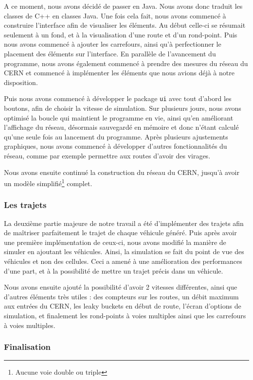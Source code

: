 \documentclass[a4paper,11pt, titlepage]{extarticle}
\begin{document}
A ce moment, nous avons décidé de passer en Java. Nous avons donc traduit les classes de C++ en classes Java. Une fois cela fait, nous avons commencé à construire l'interface afin de visualiser les éléments. Au début celle-ci se résumait seulement à un fond, et à la visualisation d'une route et d'un rond-point. Puis nous avons commencé à ajouter les carrefours, ainsi qu'à perfectionner le placement des éléments sur l'interface. En parallèle de l'avancement du programme, nous avons également commencé à prendre des mesures du réseau du CERN et commencé à implémenter les éléments que nous avions déjà à notre disposition.

Puis nous avons commencé à développer le package \texttt{ui} avec tout d'abord les boutons, afin de choisir la vitesse de simulation. Sur plusieurs jours, nous avons optimisé la boucle qui maintient le programme en vie, ainsi qu'en améliorant l'affichage du réseau, désormais sauvegardé en mémoire et donc n'étant calculé qu'une seule fois au lancement du programme. Après plusieurs ajustements graphiques, nous avons commencé à développer d'autres fonctionnalités du réseau, comme par exemple permettre aux routes d'avoir des virages.

Nous avons ensuite continué la construction du réseau du CERN, jusqu'à avoir un modèle simplifié\footnote{Aucune voie double ou triple} complet.

\subsubsection{Les trajets}

La deuxième partie majeure de notre travail a été d'implémenter des trajets afin de maîtriser parfaitement le trajet de chaque véhicule généré. Puis après avoir une première implémentation de ceux-ci, nous avons modifié la manière de simuler en ajoutant les véhicules. Ainsi, la simulation se fait du point de vue des véhicules et non des cellules. Ceci a amené à une amélioration des performances d'une part, et à la possibilité de mettre un trajet précis dans un véhicule.

Nous avons ensuite ajouté la possibilité d'avoir 2 vitesses différentes, ainsi que d'autres éléments très utiles : des compteurs sur les routes, un débit maximum aux entrées du CERN, les leaky buckets en début de route, l'écran d'options de simulation, et finalement les rond-points à voies multiples ainsi que les carrefours à voies multiples.

\subsubsection{Finalisation}
\end{document}
